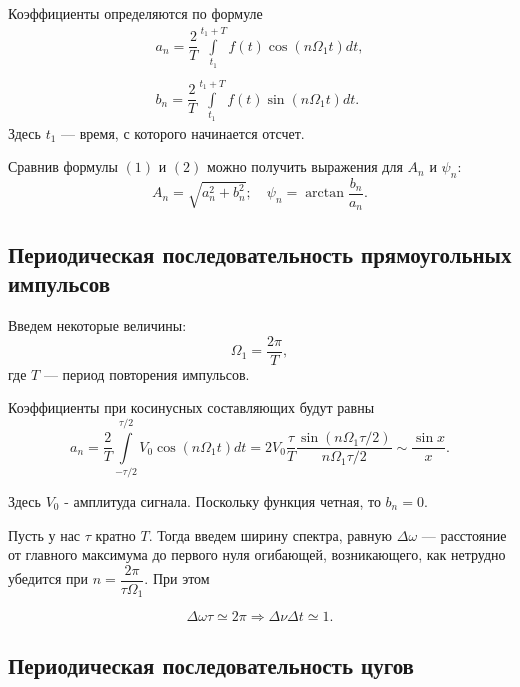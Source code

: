 \documentclass[a4paper]{article}
\theoremstyle{definition}
\theoremstyle{remark}
\begin{document}
\noindent Коэффициенты определяются по формуле
\begin{equation}
\begin{array}{c}
a_n  = \dfrac{2}{T}\int\limits_{t_1}^{t_1+T}f(t)\cos\left(n \Omega_1 t\right) dt,\\
\\
b_n = \dfrac{2}{T}\int\limits_{t_1}^{t_1+T}f(t)\sin\left(n \Omega_1 t\right) dt.
\end{array}
\end{equation}
Здесь $t_1$ --- время, с которого начинается отсчет.

\noindent Сравнив формулы $(1)$ и $(2)$ можно получить выражения для $A_n$  и $\psi_n$:
\begin{equation}
A_n = \sqrt{a_n^2+b_n^2}; \quad \psi_n = \arctan \dfrac{b_n}{a_n}.
\end{equation}

\subsection{Периодическая последовательность прямоугольных импульсов}

Введем некоторые величины:
\[\Omega_1 = \dfrac{2\pi}{T}, \]
где $T$ --- период повторения импульсов.

\noindent Коэффициенты при косинусных составляющих будут равны
\begin{equation}
a_n = \dfrac{2}{T}\int\limits_{-\tau/2}^{\tau/2}V_0\cos\left(n\Omega_1 t\right)dt = 2V_0\dfrac{\tau}{T}\dfrac{\sin\left(n\Omega_1\tau/2\right)}{n\Omega_1\tau/2} \sim \dfrac{\sin x}{x}.
\end{equation}

\noindent Здесь $V_0$ - амплитуда сигнала. Поскольку функция четная, то $b_n = 0$. 

\medskip

\noindent Пусть у нас $\tau$ кратно $T$. Тогда введем ширину спектра, равную $\Delta \omega$ --- расстояние от главного максимума до первого нуля огибающей, возникающего, как нетрудно убедится при $n = \dfrac{2\pi}{\tau \Omega_1}$. При этом

\begin{equation}
\Delta \omega \tau \simeq 2\pi \Rightarrow \Delta \nu \Delta t \simeq 1.
\end{equation}

\subsection{Периодическая последовательность цугов}
\end{document}
